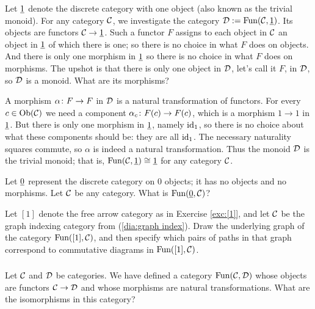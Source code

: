 \documentclass[CT4S-EN-RU]{subfiles}
\begin{document}
\begin{example}

Let $\underline{1}$ denote the discrete category with one object (also known as the trivial monoid). For any category $\mathcal{C}$, we investigate the category $\mathcal{D}:=\textnormal{Fun}(\mathcal{C},\underline{1})$. Its objects are functors $\mathcal{C}\rightarrow\underline{1}$. Such a functor $F$ assigns to each object in $\mathcal{C}$ an object in $\underline{1}$ of which there is one; so there is no choice in what $F$ does on objects. And there is only one morphism in $\underline{1}$ so there is no choice in what $F$ does on morphisms. The upshot is that there is only one object in $\mathcal{D}$, let's call it $F$, in $\mathcal{D}$, so $\mathcal{D}$ is a monoid. What are its morphisms? 

A morphism $\alpha\colon F\rightarrow F$ in $\mathcal{D}$ is a natural transformation of functors. For every $c\in\textnormal{Ob}(\mathcal{C})$ we need a component $\alpha_c\colon F(c)\rightarrow F(c)$, which is a morphism $1\to 1$ in $\underline{1}$. But there is only one morphism in $\underline{1}$, namely $\textnormal{id}_1$, so there is no choice about what these components should be: they are all $\textnormal{id}_1$. The necessary naturality squares commute, so $\alpha$ is indeed a natural transformation. Thus the monoid $\mathcal{D}$ is the trivial monoid; that is, $\textnormal{Fun}(\mathcal{C},\underline{1})\cong\underline{1}$ for any category $\mathcal{C}$.

\end{example}

\begin{exercise}
Let $\underline{0}$ represent the discrete category on 0 objects; it has no objects and no morphisms. Let $\mathcal{C}$ be any category. What is $\textnormal{Fun}(\underline{0},\mathcal{C})$?
\end{exercise}

\begin{exercise}
Let $[1]$ denote the free arrow category as in Exercise \ref{exc:[1]}, and let $\mathcal{C}$ be the graph indexing category from (\ref{dia:graph index}). Draw the underlying graph of the category $\textnormal{Fun}([1],\mathcal{C})$, and then specify which pairs of paths in that graph correspond to commutative diagrams in $\textnormal{Fun}([1],\mathcal{C})$.
\end{exercise}


\subsubsection{}

Let $\mathcal{C}$ and $\mathcal{D}$ be categories. We have defined a category $\textnormal{Fun}(\mathcal{C},\mathcal{D})$ whose objects are functors $\mathcal{C}\rightarrow\mathcal{D}$ and whose morphisms are natural transformations. What are the isomorphisms in this category? 
\end{document}
